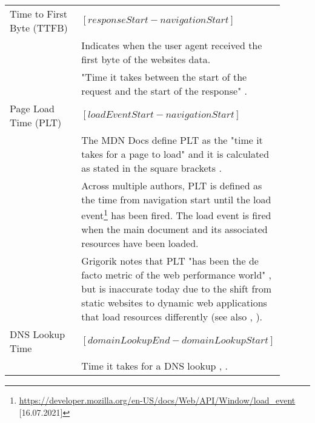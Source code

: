 \begin{center}
	\small
	\begin{longtable}{ | p{0.3\linewidth} | p{0.6\linewidth} | }
	\hline
	Time to First Byte (TTFB)
	& $[responseStart - navigationStart]$ \\
	& Indicates when the user agent received the first byte of the websites data. \\
	& "Time it takes between the start of the request and the start of the response" \cite{2021MDNTTFB}.  \\
	
	\hline
	Page Load Time (PLT)
	& $[loadEventStart - navigationStart]$ \\
	& The MDN Docs define PLT as the "time it takes for a page to load" and it is calculated as stated in the square brackets \cite{2021MDNPLT}.  \\
	& Across multiple authors, PLT is defined as the time from navigation start until the load event\footnote{\url{https://developer.mozilla.org/en-US/docs/Web/API/Window/load_event} [16.07.2021]} has been fired.
	The load event is fired when the main document and its associated resources have been loaded. \\
	& Grigorik notes that PLT "has been the de facto metric of the web performance world" \cite{2013Grigorik}, but is inaccurate today due to the shift from static websites to dynamic web applications that load resources differently (see also \cite{2018Netravali}, \cite{2013Souders}). \\
			
	
	\hline
	DNS Lookup Time
	& $[domainLookupEnd - domainLookupStart]$ \\
	& Time it takes for a DNS lookup \cite{2021MDNNavigationAndResourceTimings}, \cite{2020Wagner}. \\
	

\end{longtable}
\end{center}
